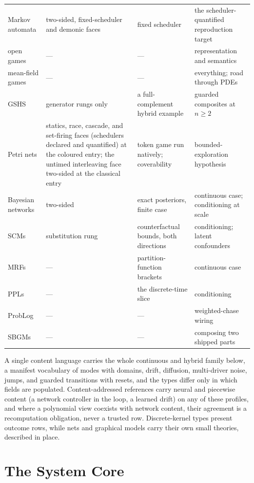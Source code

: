 \begin{center}
\begin{tabular}{@{}l>{\raggedright\arraybackslash}p{3.1cm}>{\raggedright\arraybackslash}p{3.6cm}>{\raggedright\arraybackslash}p{3.4cm}@{}}
Markov automata & two-sided, fixed-scheduler and demonic faces & fixed scheduler & the scheduler-quantified reproduction target \\
open games & --- & --- & representation and semantics \\
mean-field games & --- & --- & everything; road through PDEs \\
GSHS & generator rungs only & a full-complement hybrid example & guarded composites at $n \ge 2$ \\
Petri nets & statics, race, cascade, and set-firing faces (schedulers declared and quantified) at the coloured entry; the untimed interleaving face two-sided at the classical entry & token game run natively; coverability & bounded-exploration hypothesis \\
Bayesian networks & two-sided & exact posteriors, finite case & continuous case; conditioning at scale \\
SCMs & substitution rung & counterfactual bounds, both directions & conditioning; latent confounders \\
MRFs & --- & partition-function brackets & continuous case \\
PPLs & --- & the discrete-time slice & conditioning \\
ProbLog & --- & --- & weighted-chase wiring \\
SBGMs & --- & --- & composing two shipped parts \\
\bottomrule
\end{tabular}
\end{center}

\medskip

A single content language carries the whole continuous and hybrid
family below, a manifest vocabulary of modes with domains, drift,
diffusion, multi-driver noise, jumps, and guarded transitions with
resets, and the types differ only in which fields are populated.
Content-addressed references carry neural and piecewise content (a
network controller in the loop, a learned drift) on any of these
profiles, and where a polynomial view coexists with network content,
their agreement is a recomputation obligation, never a trusted
row. Discrete-kernel types present outcome rows, while nets and
graphical models carry their own small theories, described in
place.

\section{The System Core}
\label{sec:mt-core}

